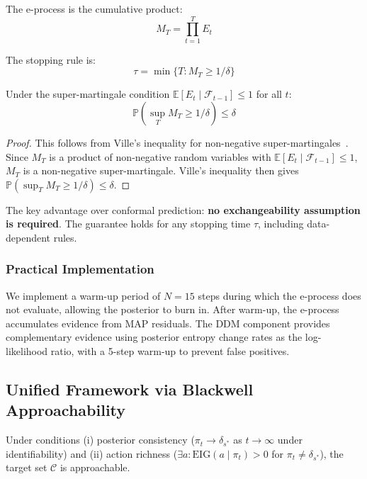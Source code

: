 The e-process is the cumulative product:
\begin{equation}
M_T = \prod_{t=1}^{T} E_t
\label{eq:eprocess}
\end{equation}

The stopping rule is:
\begin{equation}
\tau = \min\{T : M_T \geq 1/\delta\}
\label{eq:stopping}
\end{equation}

\begin{theorem}
\label{thm:anytime}
Under the super-martingale condition $\mathbb{E}[E_t \mid \mathcal{F}_{t-1}] \leq 1$ for all $t$:
\begin{equation}
\mathbb{P}\left(\sup_T M_T \geq 1/\delta\right) \leq \delta
\label{eq:ville}
\end{equation}
\end{theorem}

\begin{proof}
This follows from Ville's inequality for non-negative super-martingales~\cite{ref11}. Since $M_T$ is a product of non-negative random variables with $\mathbb{E}[E_t \mid \mathcal{F}_{t-1}] \leq 1$, $M_T$ is a non-negative super-martingale. Ville's inequality then gives $\mathbb{P}(\sup_T M_T \geq 1/\delta) \leq \delta$.
\end{proof}

The key advantage over conformal prediction: \textbf{no exchangeability assumption is required}. The guarantee holds for any stopping time $\tau$, including data-dependent rules.

\subsubsection{Practical Implementation}

We implement a warm-up period of $N = 15$ steps during which the e-process does not evaluate, allowing the posterior to burn in. After warm-up, the e-process accumulates evidence from MAP residuals. The DDM component provides complementary evidence using posterior entropy change rates as the log-likelihood ratio, with a 5-step warm-up to prevent false positives.

\subsection{Unified Framework via Blackwell Approachability}

\begin{proposition}[Approachability]
\label{prop:approachability}
Under conditions (i) posterior consistency ($\pi_t \to \delta_{s^*}$ as $t \to \infty$ under identifiability) and (ii) action richness ($\exists a : \text{EIG}(a \mid \pi_t) > 0$ for $\pi_t \neq \delta_{s^*}$), the target set $\mathcal{C}$ is approachable.
\end{proposition}

